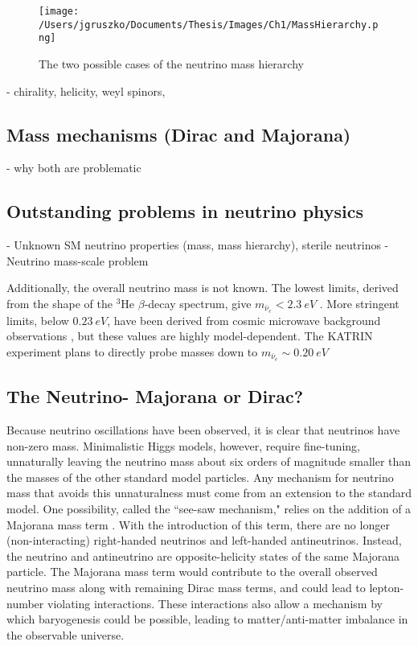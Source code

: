\begin{figure}[]
\hfil \texttt{[image: /Users/jgruszko/Documents/Thesis/Images/Ch1/MassHierarchy.png]} \hfil
\caption{The two possible cases of the neutrino mass hierarchy \cite{Hewett2012}}
\label{mass_hierarchy}
\end{figure}

	- chirality, helicity, weyl spinors, 
\subsection{Mass mechanisms (Dirac and Majorana)} 
	- why both are problematic
\subsection{Outstanding problems in neutrino physics}
	- Unknown SM neutrino properties (mass, mass hierarchy), sterile neutrinos
         - Neutrino mass-scale problem

Additionally, the overall neutrino mass is not known. The lowest limits, derived from the shape of the $^{3}$He $\beta$-decay spectrum, give $m_{\bar{\nu}_{e}} < 2.3~eV$ \cite{Eitel2005}. More stringent limits, below $0.23~eV$, have been derived from cosmic microwave background observations \cite{PlanckXVI_2013}, but these values are highly model-dependent. The KATRIN experiment plans to directly probe masses down to $m_{\bar{\nu}_{e}} \sim 0.20~eV$ \cite{KATRIN2015}

\subsection{The Neutrino- Majorana or Dirac?}
Because neutrino oscillations have been observed, it is clear that neutrinos have non-zero mass. Minimalistic Higgs models, however, require fine-tuning, unnaturally leaving the neutrino mass about six orders of magnitude smaller than the masses of the other standard model particles. Any mechanism for neutrino mass that avoids this unnaturalness must come from an extension to the standard model. One possibility, called the ``see-saw mechanism," relies on the addition of a Majorana mass term \cite{Supergravity1979}. With the introduction of this term, there are no longer (non-interacting) right-handed neutrinos and left-handed antineutrinos. Instead, the neutrino and antineutrino are opposite-helicity states of the same Majorana particle. The Majorana mass term would contribute to the overall observed neutrino mass along with remaining Dirac mass terms, and could lead to lepton-number violating interactions. These interactions also allow a mechanism by which baryogenesis could be possible, leading to matter/anti-matter imbalance in the observable universe. \cite{DiBari2012}  


